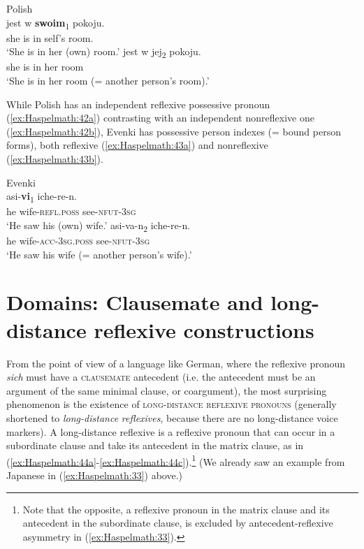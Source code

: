 \documentclass[output=paper]{langscibook}
\begin{document}
\ea%
    Polish \label{ex:Haspelmath:42}\\
    \ea \label{ex:Haspelmath:42a}
       {jest}  {w}  \textbf{{swoim}}{\textsubscript{1}} {pokoju.}\\
       she  is  in  self’s    room.  \\
    \glt  ‘She is in her (own) room.’
     \ex \label{ex:Haspelmath:42b}
      {jest}  {w}  {jej\textsubscript{2}}  {pokoju.}\\
       she  is  in  her  room  \\
    \glt  ‘She is in her room (= another person’s room).’
    \z
\z 
         
   

While Polish has an independent reflexive possessive pronoun (\ref{ex:Haspelmath:42a}) contrasting with an independent nonreflexive one (\ref{ex:Haspelmath:42b}), Evenki has possessive person indexes (= bound person forms), both reflexive (\ref{ex:Haspelmath:43a}) and nonreflexive (\ref{ex:Haspelmath:43b}).

\ea%
    Evenki \citep[103]{Nedjalkov1997}\label{ex:Haspelmath:43}\\
    \ea \label{ex:Haspelmath:43a}
      {asi-}\textbf{{vi}}{\textsubscript{1}}  {iche-re-n.}\\
        he  wife-\textsc{refl.poss}  see-\textsc{nfut-3sg} \\
    \glt‘He saw his (own) wife.’
    \ex \label{ex:Haspelmath:43b}
      {asi-va-n\textsubscript{2}}  {iche-re-n.}\\
       he  wife-\textsc{acc-3sg.poss}  see-\textsc{nfut-3sg} \\
    \glt‘He saw his wife (= another person’s wife).’
    \z
\z 
          

\section{Domains: Clausemate and long-distance reflexive constructions}\label{sec:Haspelmath:9}

From the point of view of a language like German, where the reflexive pronoun \textit{sich} must have a \textsc{clausemate} antecedent (i.e. the antecedent must be an argument of the same minimal clause, or coargument), the most surprising phenomenon is the existence of \textsc{long-distance} \textsc{reflexive} \textsc{pronouns} (generally shortened to \textit{long-distance} \textit{reflexives}, because there are no long-distance voice markers). A long-distance reflexive is a reflexive pronoun that can occur in a subordinate clause and take its antecedent in the matrix clause, as in (\ref{ex:Haspelmath:44a}-\ref{ex:Haspelmath:44c}).\footnote{ {Note that the opposite, a reflexive pronoun in the matrix clause and its antecedent in the subordinate clause, is excluded by antecedent-reflexive asymmetry in (\ref{ex:Haspelmath:33}).}} (We already saw an example from Japanese in (\ref{ex:Haspelmath:33}) above.)
\end{document}

